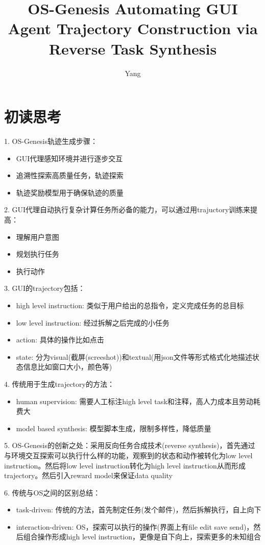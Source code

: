 \documentclass[a4paper,12pt]{article}
\title{OS-Genesis Automating GUI Agent Trajectory Construction via Reverse Task Synthesis}
\author{Yang}
\begin{document}
\maketitle
\section{初读思考}
1. OS-Genesis轨迹生成步骤：
\begin{itemize}
    \item GUI代理感知环境并进行逐步交互
    \item 追溯性探索高质量任务，轨迹探索
    \item 轨迹奖励模型用于确保轨迹的质量
\end{itemize}

2. GUI代理自动执行复杂计算任务所必备的能力，可以通过用trajuctory训练来提高：
\begin{itemize}
    \item 理解用户意图
    \item 规划执行任务
    \item 执行动作
\end{itemize}

3. GUI的trajectory包括：
\begin{itemize}
    \item high level instruction: 类似于用户给出的总指令，定义完成任务的总目标
    \item low level instruction: 经过拆解之后完成的小任务
    \item action: 具体的操作比如点击
    \item state: 分为visual(截屏(screeshot))和textual(用json文件等形式格式化地描述状态信息比如窗口大小，颜色等)
\end{itemize}

4. 传统用于生成trajectory的方法：
\begin{itemize}
    \item human supervision: 需要人工标注high level task和注释，高人力成本且劳动耗费大
    \item model based synthesis: 模型脚本生成，限制多样性，降低质量
\end{itemize}

5. OS-Genesis的创新之处：采用反向任务合成技术(reverse synthesis)，首先通过与环境交互探索可以执行什么样的功能，观察到的状态和动作被转化为low level instruction。然后将low level instruction转化为high level instruction从而形成trajectory。然后引入reward model来保证data quality

6. 传统与OS之间的区别总结：
\begin{itemize}
    \item task-driven: 传统的方法，首先制定任务(发个邮件)，然后拆解执行，自上向下
    \item interaction-driven: OS，探索可以执行的操作(界面上有file edit save send)，然后组合操作形成high level instruction，更像是自下向上，探索更多的未知组合
\end{itemize}
\end{document}
